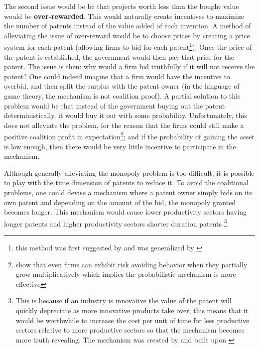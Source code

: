 The second issue would be be that projects worth less than the bought value would be \textbf{over-rewarded}. This would naturally create incentives to maximize the number of patents instead of the value added of each invention. A method of alleviating the issue of over-reward would be to choose prices by creating a price system for each patent (allowing firms to bid for each patent\footnote{this method was first suggested by \cite{kremer_1998} and was generalized by \cite{weyl2012market}}). Once the price of the patent is established, the government would then pay that price for the patent. The issue is then: why would a firm bid truthfully if it will not receive the patent? One could indeed imagine that a firm would have the incentive to overbid, and then split the surplus with the patent owner (in the language of game theory, the mechanism is not coalition proof). A partial solution to this problem would be that instead of the government buying out the patent deterministically, it would buy it out with some probability. Unfortunately, this does not alleviate the problem, for the reason that the firms could still make a positive coalition profit in expectation\footnote{\cite{PetersAdamou2018a} show that even firms can exhibit risk avoiding behavior when they partially grow multiplicatively which implies the probabilistic mechanism is more effective}; and if the probability of gaining the asset is low enough, then there would be very little incentive to participate in the mechanism. 

Although generally alleviating the monopoly problem is too difficult, it is possible to play with the time dimension of patents to reduce it. To avoid the coalitional problems, one could devise a mechanism where a patent owner simply bids on its own patent and depending on the amount of the bid, the monopoly granted becomes longer. This mechanism would cause lower productivity sectors having longer patents and higher productivity sectors shorter duration patents \footnote{ This is because if an industry is innovative the value of the patent will quickly depreciate as more innovative products take over, this means that it would be worthwhile to increase the cost per unit of time for less productive sectors relative to more productive sectors so that the mechanism becomes more truth revealing. The mechanism was created by \cite{Scotchmer1999} and built upon \cite{Cornelli1999}}.

